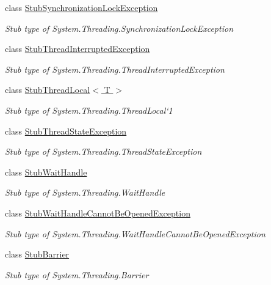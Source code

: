 \begin{DoxyCompactItemize}
class \hyperlink{class_system_1_1_threading_1_1_fakes_1_1_stub_synchronization_lock_exception}{Stub\-Synchronization\-Lock\-Exception}
\begin{DoxyCompactList}\small\item\em Stub type of System.\-Threading.\-Synchronization\-Lock\-Exception\end{DoxyCompactList}\item 
class \hyperlink{class_system_1_1_threading_1_1_fakes_1_1_stub_thread_interrupted_exception}{Stub\-Thread\-Interrupted\-Exception}
\begin{DoxyCompactList}\small\item\em Stub type of System.\-Threading.\-Thread\-Interrupted\-Exception\end{DoxyCompactList}\item 
class \hyperlink{class_system_1_1_threading_1_1_fakes_1_1_stub_thread_local_3_01_t_01_4}{Stub\-Thread\-Local$<$ T $>$}
\begin{DoxyCompactList}\small\item\em Stub type of System.\-Threading.\-Thread\-Local`1\end{DoxyCompactList}\item 
class \hyperlink{class_system_1_1_threading_1_1_fakes_1_1_stub_thread_state_exception}{Stub\-Thread\-State\-Exception}
\begin{DoxyCompactList}\small\item\em Stub type of System.\-Threading.\-Thread\-State\-Exception\end{DoxyCompactList}\item 
class \hyperlink{class_system_1_1_threading_1_1_fakes_1_1_stub_wait_handle}{Stub\-Wait\-Handle}
\begin{DoxyCompactList}\small\item\em Stub type of System.\-Threading.\-Wait\-Handle\end{DoxyCompactList}\item 
class \hyperlink{class_system_1_1_threading_1_1_fakes_1_1_stub_wait_handle_cannot_be_opened_exception}{Stub\-Wait\-Handle\-Cannot\-Be\-Opened\-Exception}
\begin{DoxyCompactList}\small\item\em Stub type of System.\-Threading.\-Wait\-Handle\-Cannot\-Be\-Opened\-Exception\end{DoxyCompactList}\item 
class \hyperlink{class_system_1_1_threading_1_1_fakes_1_1_stub_barrier}{Stub\-Barrier}
\begin{DoxyCompactList}\small\item\em Stub type of System.\-Threading.\-Barrier\end{DoxyCompactList}\item 

\end{DoxyCompactItemize}
